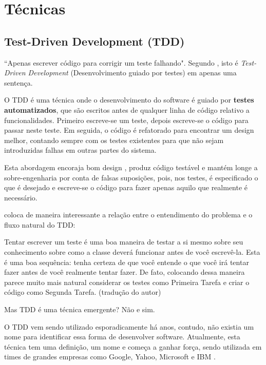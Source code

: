 \chapter{Técnicas}

\section{Test-Driven Development (TDD)}
\label{sec:tdd}
``Apenas escrever código para corrigir um teste falhando". Segundo , isto é \textit{Test-Driven Development} (Desenvolvimento guiado por testes) \cite{TDDbyExample} em apenas uma sentença.

O TDD é uma técnica onde o desenvolvimento do software é guiado por \textbf{testes automatizados}, que são escritos antes de qualquer linha de código relativo a funcionalidades. Primeiro escreve-se um teste, depois escreve-se o código para passar neste teste. Em seguida, o código é refatorado para encontrar um design melhor, contando sempre com os testes existentes para que não sejam introduzidas falhas em outras partes do sistema.

Esta abordagem encoraja bom design \cite{GrowingOOByTests}, produz código testável e mantém longe a sobre-engenharia por conta de falsas suposições, pois, nos testes, é especificado o que é desejado e escreve-se o código para fazer apenas aquilo que realmente é necessário. \cite{TestDrivenKoskela, TDDbyExample, EmpiricalTDD}

 coloca de maneira interessante a relação entre o entendimento do problema e o fluxo natural do TDD:

\begin{citacao}
Tentar escrever um teste é uma boa maneira de testar a si mesmo sobre seu conhecimento sobre como a classe deverá funcionar antes de você escrevê-la. Esta é uma boa sequência: tenha certeza de que você entende o que você irá tentar fazer antes de você realmente tentar fazer. De fato, colocando dessa maneira parece muito mais natural considerar os testes como Primeira Tarefa e criar o código como Segunda Tarefa. (tradução do autor)
\end{citacao}

Mas TDD é uma técnica emergente? Não e sim.

O TDD vem sendo utilizado esporadicamente há anos, contudo, não existia um nome para identificar essa forma de desenvolver software. Atualmente, esta técnica tem uma definição, um nome e começa a ganhar força, sendo utilizada em times de grandes empresas como Google, Yahoo, Microsoft e IBM \cite{EmpiricalTDD}.

